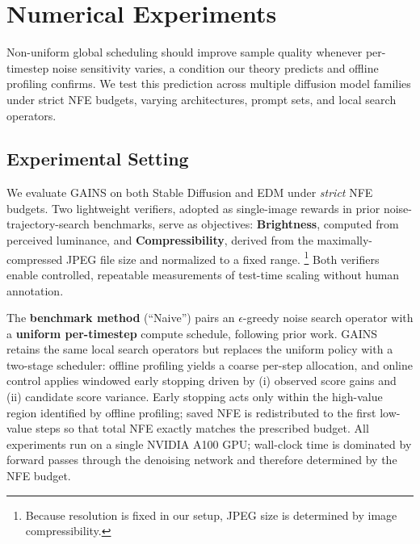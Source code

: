 \section{Numerical Experiments}
\label{sec:experiments}

Non-uniform global scheduling should improve sample quality whenever per-timestep
noise sensitivity varies, a condition our theory predicts and offline profiling
confirms.
We test this prediction across multiple diffusion model families under strict
NFE budgets, varying architectures, prompt sets, and local search operators.

\subsection{Experimental Setting}
\label{sec:exp-setting}
We evaluate GAINS on both Stable Diffusion and EDM under \emph{strict} NFE budgets.
Two lightweight verifiers, adopted as single-image rewards in prior noise-trajectory-search benchmarks, serve as objectives: \textbf{Brightness}, computed from perceived luminance, and \textbf{Compressibility}, derived from the maximally-compressed JPEG file size and normalized to a fixed range.%
\footnote{Because resolution is fixed in our setup, JPEG size is determined by image compressibility.}
Both verifiers enable controlled, repeatable measurements of test-time scaling without human annotation.

The \textbf{benchmark method} (``Naive'') pairs an $\epsilon$-greedy noise search operator with a \textbf{uniform per-timestep} compute schedule, following prior work.
GAINS retains the same local search operators but replaces the uniform policy with a two-stage scheduler: offline profiling yields a coarse per-step allocation, and online control applies windowed early stopping driven by (i) observed score gains and (ii) candidate score variance.
Early stopping acts only within the high-value region identified by offline profiling; saved NFE is redistributed to the first low-value steps so that total NFE exactly matches the prescribed budget.
All experiments run on a single NVIDIA A100 GPU; wall-clock time is dominated by forward passes through the denoising network and therefore determined by the NFE budget.

